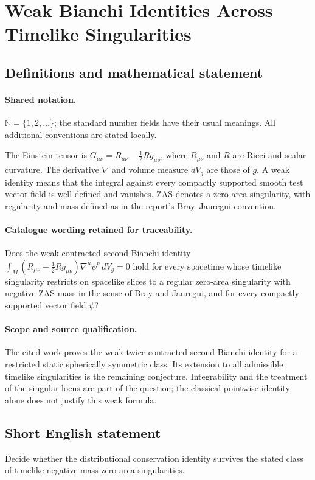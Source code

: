 \documentclass[11pt]{article}
\begin{document}
\section{Weak Bianchi Identities Across Timelike Singularities}\label{statement}

\subsection{Definitions and mathematical statement}

\paragraph{Shared notation.}$\mathbb N=\{1,2,\ldots\}$; the standard number fields have their usual meanings. All additional conventions are stated locally.


The Einstein tensor is $G_{\mu\nu}=R_{\mu\nu}-\tfrac12R g_{\mu\nu}$, where $R_{\mu\nu}$ and $R$ are Ricci and scalar curvature. The derivative $\nabla$ and volume measure $dV_g$ are those of $g$. A weak identity means that the integral against every compactly supported smooth test vector field is well-defined and vanishes. ZAS denotes a zero-area singularity, with regularity and mass defined as in the report's Bray--Jauregui convention.

\paragraph{Catalogue wording retained for traceability.}
Does the weak contracted second Bianchi identity $\int_M(R_{\mu\nu}-\tfrac12R g_{\mu\nu})\nabla^\mu\psi^\nu\,dV_g=0$ hold for every spacetime whose timelike singularity restricts on spacelike slices to a regular zero-area singularity with negative ZAS mass in the sense of Bray and Jauregui, and for every compactly supported vector field $\psi$?

\paragraph{Scope and source qualification.}The cited work proves the weak twice-contracted second Bianchi identity for a restricted static spherically symmetric class. Its extension to all admissible timelike singularities is the remaining conjecture. Integrability and the treatment of the singular locus are part of the question; the classical pointwise identity alone does not justify this weak formula.
\subsection{Short English statement}
Decide whether the distributional conservation identity survives the stated class of timelike negative-mass zero-area singularities.
\end{document}
